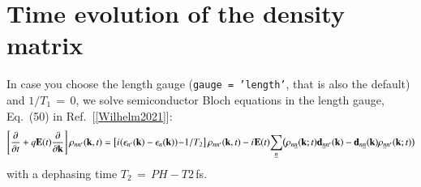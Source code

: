 \documentclass[11pt, a4paper]{scrartcl}
\newcommand{\bE}{\mathbf{E}}
\newcommand{\bk}{\mathbf{k}}
\newcommand{\sd}{\hspace{0.05em}}
\newcommand{\eqt}{\,{=}\,}
\newcommand{\rhonnprime}{\rho_{nn'}(\bk,t)}
\newcommand{\un}{\underline{n}}
\begin{document}
\section{Time evolution of the density matrix}
In case you choose the length gauge (\texttt{gauge = 'length'}, that is also the default) and $1/T_1\eqt 0$, we solve semiconductor Bloch equations in the length gauge, Eq.~(50) in Ref.~[\ref{Wilhelm2021}]:
\begin{align}
    \left[
    \frac{\partial}{\partial t}
    +q\bE(t)\frac{\partial}{\partial \bk}
    \right]\rhonnprime = 
    \big[i\sd(\epsilon_{n'}(\bk)-\epsilon_{n}(\bk))
   \sd {-}1/T_2\big]\,\rhonnprime
    -i\sd \bE(t){\sum_{\un}}
    \big(\rho_{n\un}(\bk;t) \mathbf{d}_{\un n'}(\bk)
    -  \mathbf{d}_{n\un}(\bk)\rho_{\un n'}(\bk;t)
    \big)\label{e5}
\end{align}
with a dephasing time $T_2\eqt PH-T2$\,fs. 
\end{document}
